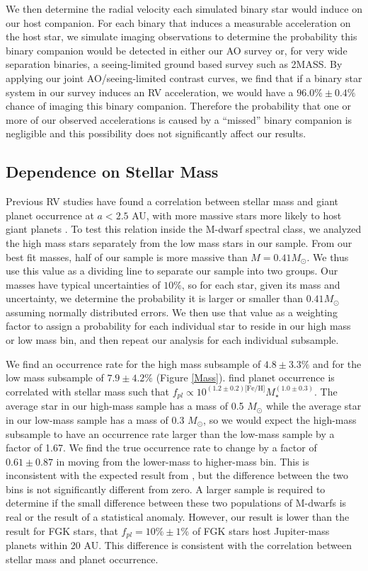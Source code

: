 We then determine the radial velocity each simulated binary star would induce on our host companion. For each binary that induces a measurable acceleration on the host star, we simulate imaging observations to determine the probability this binary companion would be detected in either our AO survey or, for very wide separation binaries, a seeing-limited ground based survey such as 2MASS. By applying our joint AO/seeing-limited contrast curves, we find that if a binary star system in our survey induces an RV acceleration, we would have a $96.0\% \pm 0.4\%$ chance of imaging this binary companion. Therefore the probability that one or more of our observed accelerations is caused by a ``missed'' binary companion is negligible and this possibility does not significantly affect our results.




\subsection{Dependence on Stellar Mass}
\label{MassDep}
Previous RV studies have found a correlation between stellar mass and giant planet occurrence at $a < 2.5$ AU, with more massive stars more likely to host giant planets \citep{Johnson10a}. To test this relation inside the M-dwarf spectral class, we analyzed the high mass stars separately from the low mass stars in our sample. From our best fit masses, half of our sample is more massive than $M = 0.41 M_\odot$. We thus use this value as a dividing line to separate our sample into two groups. Our masses have typical uncertainties of $10\%$, so for each star, given its mass and uncertainty, we determine the probability it is larger or smaller than $0.41 M_\odot$ assuming normally distributed errors. We then use that value as a weighting factor to assign a probability for each individual star to reside in our high mass or low mass bin, and then repeat our analysis for each individual subsample.

We find an occurrence rate for the high mass subsample of $4.8 \pm 3.3\%$ and for the low mass subsample of $7.9 \pm 4.2\%$ (Figure \ref{Mass}). \citet{Johnson10a} find planet occurrence is correlated with stellar mass such that $f_{pl} \propto 10^{(1.2\pm 0.2)\textrm{[Fe/H]}}M_\star^{(1.0\pm 0.3)}$. The average star in our high-mass sample has a mass of 0.5 $M_\odot$ while the average star in our low-mass sample has a mass of 0.3 $M_\odot$, so we would expect the high-mass subsample to have an occurrence rate larger than the low-mass sample by a factor of 1.67. We find the true occurrence rate to change by a factor of $0.61 \pm 0.87$ in moving from the lower-mass to higher-mass bin. This is inconsistent with the expected result from \citet{Johnson10a}, but the difference between the two bins is not significantly different from zero. A larger sample is required to determine if the small difference between these two populations of M-dwarfs is real or the result of a statistical anomaly. However, our result is lower than the \citet{Cumming08} result for FGK stars, that $f_{pl} = 10\% \pm 1\%$ of FGK stars host Jupiter-mass planets within 20 AU. This difference is consistent with the \citet{Johnson10a} correlation between stellar mass and planet occurrence. 



